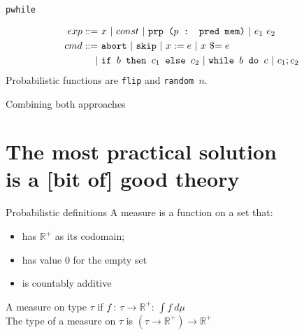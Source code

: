 \documentclass{beamer}
\begin{document}
\begin{frame}{\texttt{pwhile}}
  
\begin{align*}
  exp ::=~& x ~\vert ~ const ~\vert ~ \texttt{prp ($p$ : pred mem)}~\vert ~ e_1\ e_2\\
  cmd ::=~& \texttt{abort} ~\vert ~ \texttt{skip} ~\vert ~ x := e ~\vert ~ x\ \$\hspace{-0.25em}= e\\
  \vert ~ & \texttt{if } b \texttt{ then } c_1 \texttt{ else } c_2 ~\vert ~
            \texttt{while } b \texttt{ do } c ~\vert ~ c_1 ; c_2
\end{align*}
Probabilistic functions are \texttt{flip} and \texttt{random $n$}. 
\end{frame}


\begin{frame}{Combining both approaches}
  \begin{center}
  \end{center}
\end{frame}


\section{The most practical solution\\
is a [bit of] good theory}


\begin{frame}{Probabilistic definitions}
  A measure is a function on a set that:
  \begin{itemize}
      \item has $\mathbb{R}^+$ as its codomain;
      \item has value 0 for the empty set
      \item is countably additive
  \end{itemize}
  \bigskip
  \pause
  A measure on type $\tau$ if $f~:~\tau\to\mathbb{R}^+$: $\int f~d\mu$ \\
  \bigskip
  \pause
  The type of a measure on $\tau$ is $(\tau\to\mathbb{R}^+)\to\mathbb{R}^+$
\end{frame}
\end{document}
